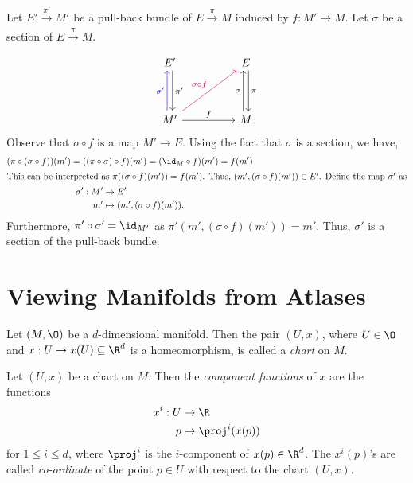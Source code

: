 \begin{remark}
	Let \(E' \xrightarrow[]{\ \pi'\ } M'\) be a pull-back bundle of \(E \xrightarrow[]{\ \pi\ } M\) induced by \(f: M' \to M\). Let \(\sigma\) be a section of \(E \xrightarrow[]{\ \pi\ } M\).
	\begin{equation*}
		\begin{tikzcd}
			E' \arrow[dd, shift left, "\pi'"] & & E \arrow[dd, shift left, "\pi"] \\
			& & \\
			M' \arrow[uu, blue, shift left, "\sigma'"] \arrow[rr, "f"] \arrow[rruu, purple, "\sigma \circ f"] & & M \arrow[uu, shift left, "\sigma"]
		\end{tikzcd}
	\end{equation*}
	Observe that \(\sigma \circ f\) is a map \(M' \to E\). Using the fact that \(\sigma\) is a section, we have,
	\begin{gather}
		(\pi \circ (\sigma \circ f))(m') = ((\pi \circ \sigma) \circ f)(m') = (\id_{M} \circ f)(m') = f(m') \nonumber \\
		\intertext{This can be interpreted as \(\pi((\sigma \circ f)(m')) = f(m')\). Thus, \((m', (\sigma \circ f)(m')) \in E'\). Define the map \(\sigma'\) as}
		\begin{aligned}
			\sigma': M' & \to E'                              \\
			m'          & \mapsto (m', (\sigma \circ f)(m')).
		\end{aligned}
	\end{gather}
	Furthermore, \(\pi' \circ \sigma' = \id_{M'}\) as \(\pi'(m', (\sigma \circ f)(m')) = m'\). Thus, \(\sigma'\) is a section of the pull-back bundle.
\end{remark}

\section{Viewing Manifolds from Atlases}

\begin{definition}[Chart]\label{def:chart}
	Let \((M, \O)\) be a \(d\)-dimensional manifold. Then the pair \((U, x)\), where \(U \in \O\) and \(x: U \to x(U) \subseteq \R^d\) is a homeomorphism, is called a \emph{chart} on \(M\).
\end{definition}

\begin{remark}\label{rem:component-functions}
	Let \((U, x)\) be a chart on \(M\). Then the \emph{component functions} of \(x\) are the functions
	\begin{equation}
		\begin{aligned}
			x^i: U & \to \R                \\
			p      & \mapsto \proj^i(x(p))
		\end{aligned}
	\end{equation}
	for \(1 \le i \le d\), where \(\proj^i\) is the \(i\)-component of \(x(p) \in \R^d\). The \(x^i(p)\)'s are called \emph{co-ordinate} of the point \(p \in U\) with respect to the chart \((U, x)\).
\end{remark}

